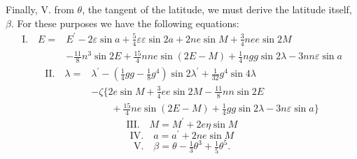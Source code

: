 \par\noindent\hspace*{\parindent}Finally, V. from \(\theta\), the tangent of the latitude, we must derive the latitude itself, \(\beta\).
For these purposes we have the following equations:
\[
\begin{aligned}
\text{I.}\quad E={}&E^{\prime}-2\varepsilon\sin a+\tfrac54\varepsilon\varepsilon\sin2a
 +2ne\sin M+\tfrac34nee\sin2M\\
&-\tfrac{11}{8}n^3\sin2E+\tfrac{15}{4}nne\sin(2E-M)
 +\tfrac14ngg\sin2\lambda-3nn\varepsilon\sin a
\end{aligned}
\]
\[
\begin{aligned}
\text{II.}\quad\lambda={}&\lambda^{\prime}
 -\left(\tfrac14gg-\tfrac18g^4\right)\sin2\lambda^{\prime}
 +\tfrac{1}{32}g^4\sin4\lambda\\
&-\zeta\bigl\{2e\sin M+\tfrac34ee\sin2M-\tfrac{11}{8}nn\sin2E\\
&\qquad+\tfrac{15}{4}ne\sin(2E-M)+\tfrac14gg\sin2\lambda-3n\varepsilon\sin a\bigr\}
\end{aligned}
\]
\[
\text{III.}\quad M=M^{\prime}+2e\eta\sin M
\]
\[
\text{IV.}\quad a=a^{\prime}+2ne\sin M
\]
\[
\text{V.}\quad\beta=\theta-\tfrac13\theta^3+\tfrac15\theta^5.
\]
\clearpage
\endgroup
